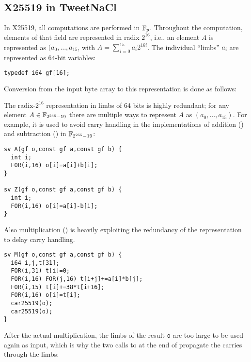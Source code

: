
\subsection{X25519 in TweetNaCl}
\label{preliminaries:B}


In X25519, all computations are performed in $\mathbb{F}_{p}$.
Throughout the computation, elements of that field 
are represented in radix $2^{16}$, 
i.e., an element $A$ is represented as $(a_0,\dots,a_{15}$,
with $A = \sum_{i=0}^{15}a_i2^{16i}$.
The individual ``limbs'' $a_i$ are represented as
64-bit  variables:

\begin{lstlisting}[language=Ctweetnacl]
typedef i64 gf[16];
\end{lstlisting}

Conversion from the input byte array to this representation is done
as follows:


The radix-$2^{16}$ representation in limbs of $64$ bits is
highly redundant; for any element $A \in \mathbb{F}_{2^{255}-19}$ there are
multiple ways to represent $A$ as $(a_0,\dots,a_{15})$.
For example, it is used to avoid carry handling in 
the implementations of addition () 
and subtraction () in $\mathbb{F}_{2^{255}-19}$:

\begin{lstlisting}[language=Ctweetnacl]
sv A(gf o,const gf a,const gf b) {
  int i;
  FOR(i,16) o[i]=a[i]+b[i];
}

sv Z(gf o,const gf a,const gf b) {
  int i;
  FOR(i,16) o[i]=a[i]-b[i];
}
\end{lstlisting}

Also multiplication () is heavily exploiting the redundancy
of the representation to delay carry handling.

\begin{lstlisting}[language=Ctweetnacl]
sv M(gf o,const gf a,const gf b) {
  i64 i,j,t[31];
  FOR(i,31) t[i]=0;
  FOR(i,16) FOR(j,16) t[i+j]+=a[i]*b[j];
  FOR(i,15) t[i]+=38*t[i+16];
  FOR(i,16) o[i]=t[i];
  car25519(o);
  car25519(o);
}
\end{lstlisting}

After the actual multiplication, the limbs of the result \texttt{o} are
too large to be used again as input, which is why the two calls to
 at the end of  propagate the carries through the limbs:

